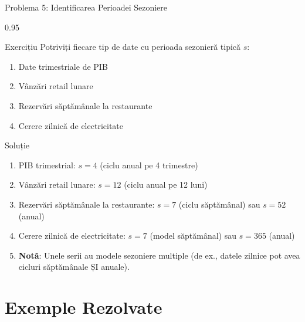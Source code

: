 \documentclass[9pt, aspectratio=169, t]{beamer}
\begin{document}
\begin{frame}{Problema 5: Identificarea Perioadei Sezoniere}
    \begin{cminipage}{0.95\textwidth}
    \begin{block}{Exercițiu}
        Potriviți fiecare tip de date cu perioada sezonieră tipică $s$:
        \begin{enumerate}\setlength{\itemsep}{0pt}
            \item Date trimestriale de PIB
            \item Vânzări retail lunare
            \item Rezervări săptămânale la restaurante
            \item Cerere zilnică de electricitate
        \end{enumerate}
    \end{block}

    \vspace{0.2cm}
    \pause
    \begin{exampleblock}{Soluție}
        \begin{enumerate}\setlength{\itemsep}{0pt}
            \item PIB trimestrial: $s = 4$ (ciclu anual pe 4 trimestre)
            \item Vânzări retail lunare: $s = 12$ (ciclu anual pe 12 luni)
            \item Rezervări săptămânale la restaurante: $s = 7$ (ciclu săptămânal) sau $s = 52$ (anual)
            \item Cerere zilnică de electricitate: $s = 7$ (model săptămânal) sau $s = 365$ (anual)
            \item \textbf{Notă}: Unele serii au modele sezoniere multiple (de ex., datele zilnice pot avea cicluri săptămânale ȘI anuale).
        \end{enumerate}
    \end{exampleblock}
    \end{cminipage}
\end{frame}

\section{Exemple Rezolvate}
\end{document}
